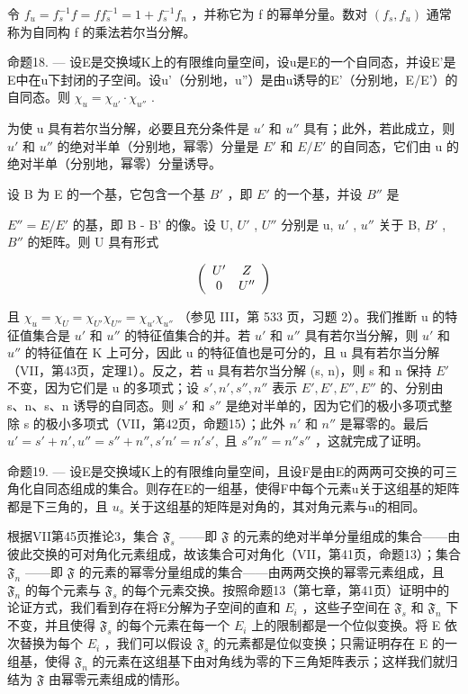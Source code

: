 令 \(f_{u}=f_{s}^{-1}f=ff_{s}^{-1}=1+f_{s}^{-1}f_{n}\) ，并称它为 f 的幂单分量。数对 \((f_{s},f_{u})\) 通常称为自同构 f 的乘法若尔当分解。

命题18. --- 设E是交换域K上的有限维向量空间，设u是E的一个自同态，并设E'是E中在u下封闭的子空间。设u'（分别地，u''）是由u诱导的E'（分别地，E/E'）的自同态。则 \(\chi_{u} = \chi_{u'} \cdot \chi_{u''}\) .

为使 u 具有若尔当分解，必要且充分条件是 \(u'\) 和 \(u''\) 具有；此外，若此成立，则 \(u'\) 和 \(u''\) 的绝对半单（分别地，幂零）分量是 \(E'\) 和 \(E/E'\) 的自同态，它们由 u 的绝对半单（分别地，幂零）分量诱导。

设 B 为 E 的一个基，它包含一个基 \(B'\) ，即 \(E'\) 的一个基，并设 \(B''\) 是

\(E'' = E/E'\) 的基，即 B - B' 的像。设 U, \(U'\) , \(U''\) 分别是 u, \(u'\) , \(u''\) 关于 B, \(B'\) , \(B''\) 的矩阵。则 U 具有形式

\[
\left( \begin{array}{c c} U ^ {\prime} & Z \\ 0 & U ^ {\prime \prime} \end{array} \right)
\]

且 \(\chi_{u} = \chi_{U} = \chi_{U'} \chi_{U''} = \chi_{u'} \chi_{u''}\) （参见 III，第 533 页，习题 2）。我们推断 u 的特征值集合是 \(u'\) 和 \(u''\) 的特征值集合的并。若 \(u'\) 和 \(u''\) 具有若尔当分解，则 \(u'\) 和 \(u''\) 的特征值在 K 上可分，因此 u 的特征值也是可分的，且 u 具有若尔当分解（VII，第43页，定理1）。反之，若 u 具有若尔当分解 (s, n)，则 s 和 n 保持 \(E'\) 不变，因为它们是 u 的多项式；设 \(s', n', s'', n''\) 表示 \(E', E', E'', E''\) 的、分别由 s、n、s、n 诱导的自同态。则 \(s'\) 和 \(s''\) 是绝对半单的，因为它们的极小多项式整除 s 的极小多项式（VII，第42页，命题15）；此外 \(n'\) 和 \(n''\) 是幂零的。最后 \(u' = s' + n', u'' = s'' + n'', s'n' = n's',\) 且 \(s''n'' = n''s''\) ，这就完成了证明。

命题19. --- 设E是交换域K上的有限维向量空间，且设F是由E的两两可交换的可三角化自同态组成的集合。则存在E的一组基，使得F中每个元素u关于这组基的矩阵都是下三角的，且 \(u_{s}\) 关于这组基的矩阵是对角的，其对角元素与u的相同。

根据VII第45页推论3，集合 \(\mathfrak{F}_s\) ——即 \(\mathfrak{F}\) 的元素的绝对半单分量组成的集合——由彼此交换的可对角化元素组成，故该集合可对角化（VII，第41页，命题13）；集合 \(\mathfrak{F}_n\) ——即 \(\mathfrak{F}\) 的元素的幂零分量组成的集合——由两两交换的幂零元素组成，且 \(\mathfrak{F}_n\) 的每个元素与 \(\mathfrak{F}_s\) 的每个元素交换。按照命题13（第七章，第41页）证明中的论证方式，我们看到存在将E分解为子空间的直和 \(E_i\) ，这些子空间在 \(\mathfrak{F}_s\) 和 \(\mathfrak{F}_n\) 下不变，并且使得 \(\mathfrak{F}_s\) 的每个元素在每一个 \(E_i\) 上的限制都是一个位似变换。将 E 依次替换为每个 \(E_i\) ，我们可以假设 \(\mathfrak{F}_s\) 的元素都是位似变换；只需证明存在 E 的一组基，使得 \(\mathfrak{F}_n\) 的元素在这组基下由对角线为零的下三角矩阵表示；这样我们就归结为 \(\mathfrak{F}\) 由幂零元素组成的情形。

